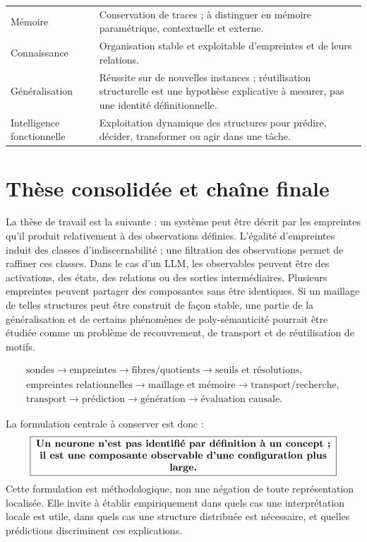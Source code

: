 \documentclass[11pt,a4paper]{article}
\theoremstyle{remark}
\newcommand{\1}{\mathbf 1}
\begin{document}
\begin{longtable}{>{\raggedright\arraybackslash}p{}>{\raggedright\arraybackslash}p{}}
Mémoire & Conservation de traces ; à distinguer en mémoire paramétrique, contextuelle et externe.\\
Connaissance & Organisation stable et exploitable d'empreintes et de leurs relations.\\
Généralisation & Réussite sur de nouvelles instances ; réutilisation structurelle est une hypothèse explicative à mesurer, pas une identité définitionnelle.\\
Intelligence fonctionnelle & Exploitation dynamique des structures pour prédire, décider, transformer ou agir dans une tâche.\\
\bottomrule
\end{longtable}

\section{Thèse consolidée et chaîne finale}

La thèse de travail est la suivante : un système peut être décrit par les empreintes qu'il produit relativement à des observations définies. L'égalité d'empreintes induit des classes d'indiscernabilité ; une filtration des observations permet de raffiner ces classes. Dans le cas d'un LLM, les observables peuvent être des activations, des états, des relations ou des sorties intermédiaires. Plusieurs empreintes peuvent partager des composantes sans être identiques. Si un maillage de telles structures peut être construit de façon stable, une partie de la généralisation et de certains phénomènes de poly-sémanticité pourrait être étudiée comme un problème de recouvrement, de transport et de réutilisation de motifs.

\[
\boxed{
\begin{gathered}
\text{sondes}\to\text{empreintes}\to\text{fibres/quotients}\to\text{seuils et résolutions},\\
\text{empreintes relationnelles}\to\text{maillage et mémoire}\to\text{transport/recherche},\\
\text{transport}\to\text{prédiction}\to\text{génération}\to\text{évaluation causale}.
\end{gathered}}
\]

La formulation centrale à conserver est donc :
\[
\fbox{\parbox{0.88\textwidth}{\centering\textbf{Un neurone n'est pas identifié par définition à un concept ; il est une composante observable d'une configuration plus large.}}}
\]
Cette formulation est méthodologique, non une négation de toute représentation localisée. Elle invite à établir empiriquement dans quels cas une interprétation locale est utile, dans quels cas une structure distribuée est nécessaire, et quelles prédictions discriminent ces explications.
\end{document}
